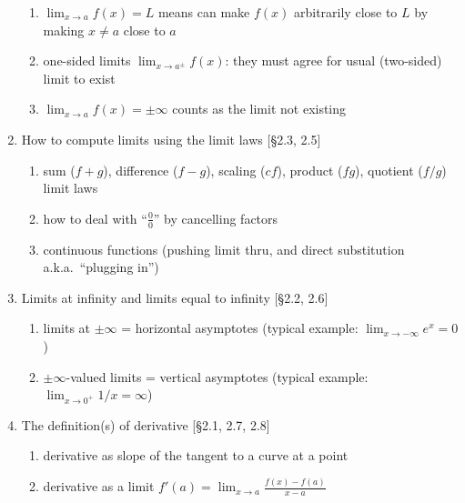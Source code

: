 \documentclass[11pt]{article}
\begin{document}
\begin{enumerate}
\begin{enumerate}
\item $\lim_{x\to a} f(x) = L$ means can make $f(x)$ arbitrarily close to $L$ by making $x \neq a$ close to $a$
\item one-sided limits $\lim_{x\to a^{\pm}} f(x)$: they must agree for usual (two-sided) limit to exist
\item $\lim_{x\to a} f(x) = \pm \infty$ counts as the limit not existing
\end{enumerate}
\item How to compute limits using the limit laws [\S2.3, 2.5]
\begin{enumerate}
\item sum ($f+g$), difference ($f-g$), scaling ($cf$), product ($fg$), quotient ($f/g$) limit laws
\item how to deal with ``$\frac{0}{0}$'' by cancelling factors
\item continuous functions (pushing limit thru, and direct substitution a.k.a.~``plugging in'')
\end{enumerate}
\item Limits at infinity and limits equal to infinity [\S2.2, 2.6]
\begin{enumerate}
\item limits at $\pm \infty$ = horizontal asymptotes (typical example: $\lim_{x\to -\infty} e^x = 0$)
\item $\pm \infty$-valued limits = vertical asymptotes (typical example: $\lim_{x\to 0^+} 1/x=\infty$)
\end{enumerate}
\item The definition(s) of derivative [\S2.1, 2.7, 2.8]
\begin{enumerate}
\item derivative as slope of the tangent to a curve at a point
\item derivative as a limit $f'(a) = \displaystyle \lim_{x \to a} \frac{f(x)-f(a)}{x-a}$
\end{enumerate}
\end{enumerate}
\end{document}
